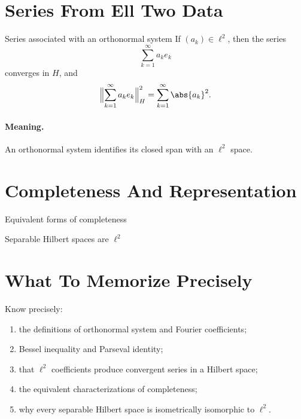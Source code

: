 \documentclass[header={Appendix F Exam Study Notes}]{study-note}
\begin{document}
\section{Series From Ell Two Data}

\begin{thmbox}{Series associated with an orthonormal system}
If $(a_k)\in \ell^2$, then the series
\[
\sum_{k=1}^{\infty}a_ke_k
\]
converges in $H$, and
\[
\Bigl\|\sum_{k=1}^{\infty}a_ke_k\Bigr\|_H^2=\sum_{k=1}^{\infty}\abs{a_k}^2.
\]
\end{thmbox}

\paragraph{Meaning.}
An orthonormal system identifies its closed span with an $\ell^2$ space.

\section{Completeness And Representation}

\begin{thmbox}{Equivalent forms of completeness}
\thmOrthonormalCompleteEquiv
\end{thmbox}

\begin{thmbox}{Separable Hilbert spaces are $\ell^2$}
\thmSeparableHilbertONB

\medskip

\thmSeparableHilbertIsomorphicEllTwo
\end{thmbox}

\section{What To Memorize Precisely}

\begin{focusbox}
Know precisely:
\begin{enumerate}
\item the definitions of orthonormal system and Fourier coefficients;
\item Bessel inequality and Parseval identity;
\item that $\ell^2$ coefficients produce convergent series in a Hilbert space;
\item the equivalent characterizations of completeness;
\item why every separable Hilbert space is isometrically isomorphic to $\ell^2$.
\end{enumerate}
\end{focusbox}
\end{document}
